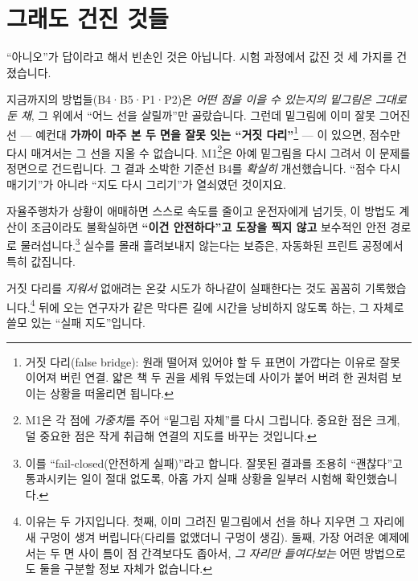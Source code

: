 \documentclass[11pt]{article}
\begin{document}
\section{그래도 건진 것들}

``아니오''가 답이라고 해서 빈손인 것은 아닙니다. 시험 과정에서 값진 것 세 가지를
건졌습니다.

\begin{description}[leftmargin=0em,style=nextline]
  \item[\textmd{\textbf{(1) 연결 방식을 아예 바꾸면 진짜로 나아진다 --- M1}}]
  지금까지의 방법들(B4·B5·P1·P2)은 \emph{어떤 점을 이을 수 있는지의 밑그림은 그대로
  둔 채}, 그 위에서 ``어느 선을 살릴까''만 골랐습니다. 그런데 밑그림에 이미 잘못 그어진
  선 --- 예컨대 \textbf{가까이 마주 본 두 면을 잘못 잇는 ``거짓 다리''}\footnote{거짓
  다리(false bridge): 원래 떨어져 있어야 할 두 표면이 가깝다는 이유로 잘못 이어져 버린
  연결. 얇은 책 두 권을 세워 두었는데 사이가 붙어 버려 한 권처럼 보이는 상황을 떠올리면
  됩니다.} --- 이 있으면, 점수만 다시 매겨서는 그 선을 지울 수 없습니다.
  M1\footnote{M1은 각 점에 \emph{가중치}를 주어 ``밑그림 자체''를 다시 그립니다.
  중요한 점은 크게, 덜 중요한 점은 작게 취급해 연결의 지도를 바꾸는 것입니다.}은
  아예 밑그림을 다시 그려서 이 문제를 정면으로 건드립니다. 그 결과 소박한 기준선 B4를
  \emph{확실히} 개선했습니다. ``점수 다시 매기기''가 아니라 ``지도 다시 그리기''가
  열쇠였던 것이지요.
  \item[\textmd{\textbf{(2) 확신이 없으면 ``안전하게 실패''한다 --- G4}}]
  자율주행차가 상황이 애매하면 스스로 속도를 줄이고 운전자에게 넘기듯,
  이 방법도 계산이 조금이라도 불확실하면 \textbf{``이건 안전하다''고 도장을 찍지 않고}
  보수적인 안전 경로로 물러섭니다.\footnote{이를 ``fail-closed(안전하게 실패)''라고
  합니다. 잘못된 결과를 조용히 ``괜찮다''고 통과시키는 일이 절대 없도록, 아홉 가지
  실패 상황을 일부러 시험해 확인했습니다.} 실수를 몰래 흘려보내지 않는다는 보증은,
  자동화된 프린트 공정에서 특히 값집니다.
  \item[\textmd{\textbf{(3) ``해도 안 되는 길''의 지도}}]
  거짓 다리를 \emph{지워서} 없애려는 온갖 시도가 하나같이 실패한다는 것도 꼼꼼히
  기록했습니다.\footnote{이유는 두 가지입니다. 첫째, 이미 그려진 밑그림에서 선을
  하나 지우면 그 자리에 새 구멍이 생겨 버립니다(다리를 없앴더니 구멍이 생김). 둘째,
  가장 어려운 예제에서는 두 면 사이 틈이 점 간격보다도 좁아서, \emph{그 자리만 들여다보는}
  어떤 방법으로도 둘을 구분할 정보 자체가 없습니다.} 뒤에 오는 연구자가 같은 막다른
  길에 시간을 낭비하지 않도록 하는, 그 자체로 쓸모 있는 ``실패 지도''입니다.
\end{description}
\end{document}
